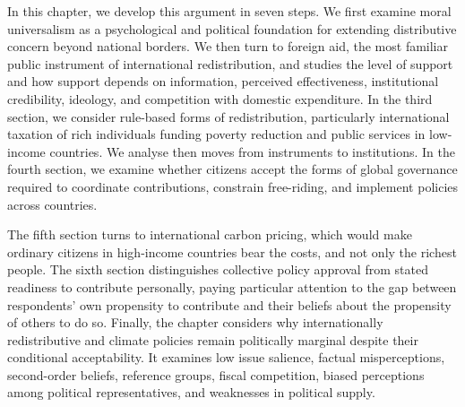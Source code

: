\documentclass[11pt,a4paper]{article}
\begin{document}
In this chapter, we develop this argument in seven steps. We first examine moral universalism as a psychological and political foundation for extending distributive concern beyond national borders. We then turn to foreign aid, the most familiar public instrument of international redistribution, and studies 
the level of support and how support depends on information, perceived effectiveness, institutional credibility, ideology, and competition with domestic expenditure. In the third section, we consider rule-based forms of redistribution, particularly international taxation of rich individuals funding poverty reduction and public services in low-income countries.
We analyse then moves from instruments to institutions. In the fourth section, we examine whether citizens accept the forms of global governance required to coordinate contributions, constrain free-riding, and implement policies across countries. 

The fifth section turns to international carbon pricing, which would make ordinary citizens in high-income countries bear the costs, and not only the richest people. The sixth section distinguishes collective policy approval from stated readiness to contribute personally, paying particular attention to the gap between respondents’ own propensity to contribute and their beliefs about the propensity of others to do so. 
Finally, the chapter considers why internationally redistributive and climate policies remain politically marginal despite their conditional acceptability. It examines low issue salience, factual misperceptions, second-order beliefs, reference groups, fiscal competition, biased perceptions among political representatives, and weaknesses in political supply.

\newpage


\end{document}
